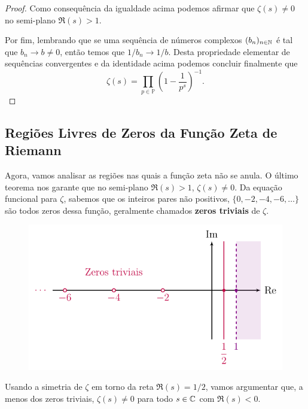 \begin{proof}
        Como consequência da igualdade acima podemos afirmar que $\zeta(s)\neq 0$ no semi-plano
        $\Re(s) > 1$. 
        
        
        Por fim, lembrando que se uma sequência
        de números complexos $(b_n)_{n\in\mathbb{N}}$ 
        é tal que $b_n\to b\neq 0$,
        então temos que $1/b_n \to 1/b$. 
        Desta propriedade elementar de sequências convergentes e da identidade acima podemos concluir finalmente que 
        \[
        \zeta(s) 
        = \prod_{p\in\mathbb{P}} \left(1 - \frac{1}{p^s}\right)^{-1}.
        \]
    \end{proof}
    
    \subsection{Regiões Livres de Zeros da Função Zeta de Riemann}
    
    Agora, vamos analisar as regiões nas quais a função zeta não se anula.
    O último teorema nos garante que no semi-plano $\Re(s)>1$, $\zeta(s) \neq 0$.
    Da equação funcional para $\zeta$, sabemos que os inteiros pares não positivos,
    $\{0, -2, -4, -6, \dots\}$ são todos zeros dessa função, geralmente chamados
    \textbf{zeros triviais} de $\zeta$.
    \begin{figure}[H]\centering
        \includegraphics{Figuras/zeros triviais.pdf}
    \end{figure}
    Usando a simetria de $\zeta$ em torno da reta $\Re(s) = 1/2$, vamos argumentar que,
    a menos dos zeros triviais, $\zeta(s)\neq 0$ para todo $s\in\mathbb{C}$ com $\Re(s)<0$.
    
